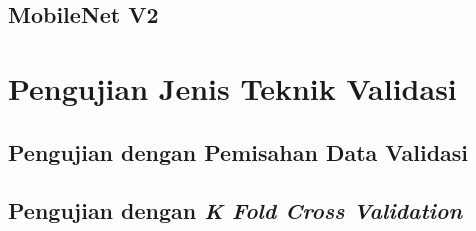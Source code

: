 \subsection{MobileNet V2}
\label{mobilenetv2}

\section{Pengujian Jenis Teknik Validasi}
\label{sec:pengujian-validation}

\subsection{Pengujian dengan Pemisahan Data Validasi}
\label{normal-validasi}

\subsection{Pengujian dengan \textit{K Fold Cross Validation}}
\label{cross-validasi}